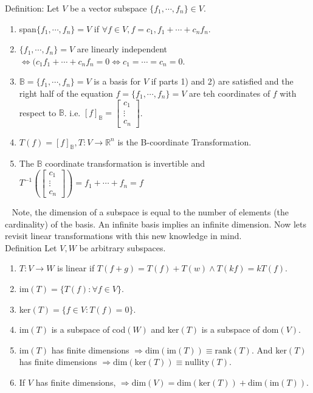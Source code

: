 \documentclass[12pt]{article}
\begin{document}
Definition: Let $V$ be a vector subspace $\lbrace f_1,\cdots,f_n\rbrace\in V$.
\begin{enumerate}
\item span$\lbrace f_1,\cdots,f_n\rbrace=V$ if $\forall f\in V,f=c_1,f_1+\cdots+c_nf_n$.
\item $\lbrace f_1,\cdots,f_n\rbrace=V$ are linearly independent $\Leftrightarrow (c_1f_1+\cdots+c_nf_n=0\Leftrightarrow c_1=\cdots=c_n=0$.
\item $\mathbb{B}=\lbrace f_1,\cdots,f_n\rbrace=V$ is a basis for $V$ if parts 1) and 2) are satisfied and the right half of the equation $f=\lbrace f_1,\cdots,f_n\rbrace=V$ are teh coordinates of $f$ with respect to $\mathbb{B}$. i.e. $[f]_\mathbb{B}=\begin{bmatrix}c_1\\\vdots\\c_n\end{bmatrix}$.
\item $T(f)=[f]_\mathbb{B},T:V\rightarrow\mathbb{R}^n$ is the B-coordinate Transformation.
\item The $\mathbb{B}$ coordinate transformation is invertible and $T^{-1}(\begin{bmatrix}c_1\\\vdots\\c_n\end{bmatrix})=f_1+\cdots+f_n=f$
\end{enumerate}

$\,\,\,$ Note, the dimension of a subspace is equal to the number of elements (the cardinality) of the basis. An infinite basis implies an infinite dimension. Now lets revisit linear transformations with this new knowledge in mind.\\

Definition Let $V,W$ be arbitrary subspaces.
\begin{enumerate}
\item $T:V\rightarrow W$ is linear if $T(f+g)=T(f)+T(w)\land T(kf)=kT(f)$.
\item im$(T)=\lbrace T(f):\forall f\in V\rbrace$.
\item ker$(T)=\lbrace f\in V:T(f)=0\rbrace$.
\item im$(T)$ is a subspace of cod$(W)$ and ker$(T)$ is a subspace of dom$(V)$.
\item im$(T)$ has finite dimensions $\Rightarrow \text{dim}(\text{im}(T))\equiv\text{rank}(T)$. And ker$(T)$ has finite dimensions $\Rightarrow \text{dim}(\text{ker}(T))\equiv\text{nullity}(T)$.
\item If $V$ has finite dimensions, $\Rightarrow \text{dim}(V)=\text{dim}(\text{ker}(T))+\text{dim}(\text{im}(T))$.
\end{enumerate}
\end{document}
